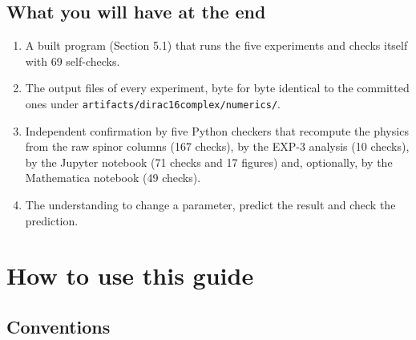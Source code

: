 \documentclass[11pt]{article}
\begin{document}
\subsection{What you will have at the end}

\begin{enumerate}
\item A built program (Section 5.1) that runs the five experiments and checks itself with 69 self-checks.
\item The output files of every experiment, byte for byte identical to the committed ones under \texttt{artifact\allowbreak{}s/dirac1\allowbreak{}6complex\allowbreak{}/numeric\allowbreak{}s/}.
\item Independent confirmation by five Python checkers that recompute the physics from the raw spinor columns (167 checks), by the EXP-3 analysis (10 checks), by the Jupyter notebook (71 checks and 17 figures) and, optionally, by the Mathematica notebook (49 checks).
\item The understanding to change a parameter, predict the result and check the prediction.
\end{enumerate}

\section{How to use this guide}

\subsection{Conventions}
\end{document}
